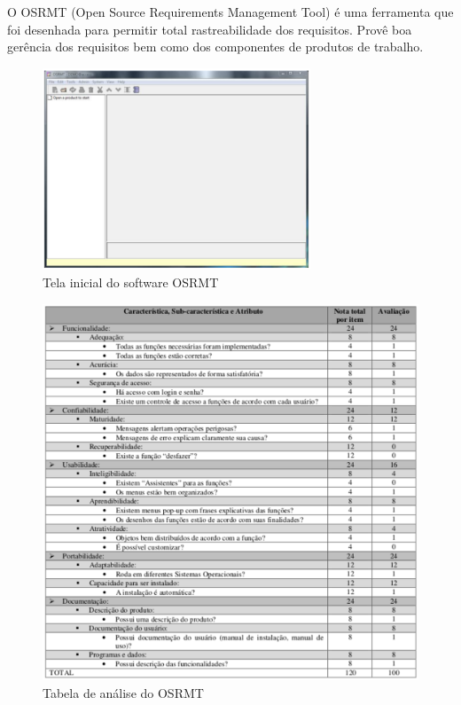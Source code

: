   O OSRMT (Open Source Requirements Management Tool) é uma ferramenta que foi desenhada para permitir total rastreabilidade dos
  requisitos. Provê boa gerência dos requisitos bem como dos componentes de produtos de trabalho.

  \begin{figure}[!h]
    \centering
    \includegraphics[width=8cm, keepaspectratio=true]{figuras/ferramentas/osrmt1.eps}
    \caption{Tela inicial do software OSRMT}
  \end{figure}

  \begin{figure}[!h]
    \centering
    \includegraphics[width=12cm, keepaspectratio=true]{figuras/ferramentas/osrmt2.eps}
    \caption{Tabela de análise do OSRMT}
  \end{figure}

  \newpage

